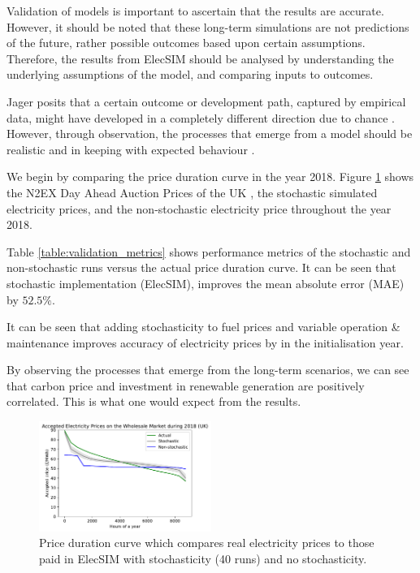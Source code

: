 
Validation of models is important to ascertain that the results are accurate. However, it should be noted that these long-term simulations are not predictions of the future, rather possible outcomes based upon certain assumptions. Therefore, the results from ElecSIM should be analysed by understanding the underlying assumptions of the model, and comparing inputs to outcomes.

Jager posits that a certain outcome or development path, captured by empirical data, might have developed in a completely different direction due to chance \cite{Jager2006a}. However, through observation, the processes that emerge from a model should be realistic and in keeping with expected behaviour \cite{Jager2006}.

We begin by comparing the price duration curve in the year 2018. Figure \ref{fig:price_duration_curve} shows the N2EX Day Ahead Auction Prices of the UK \cite{nordpool_2019}, the stochastic simulated electricity prices, and the non-stochastic electricity price throughout the year 2018.

Table \ref{table:validation_metrics} shows performance metrics of the stochastic and non-stochastic runs versus the actual price duration curve. It can be seen that stochastic implementation (ElecSIM), improves the mean absolute error (MAE) by $52.5\%$.

It can be seen that adding stochasticity to fuel prices and variable operation \& maintenance improves accuracy of electricity prices by  in the initialisation year.

By observing the processes that emerge from the long-term scenarios, we can see that carbon price and investment in renewable generation are positively correlated. This is what one would expect from the results.


\begin{figure}[H]
	\begin{center}
		\includegraphics[width=0.5\textwidth]{figures/load_price_duration_curve_comparison.pdf}
		\caption{Price duration curve which compares real electricity prices to those paid in ElecSIM with stochasticity (40 runs) and no stochasticity.}
		\label{fig:price_duration_curve}
	\end{center}
\end{figure}

